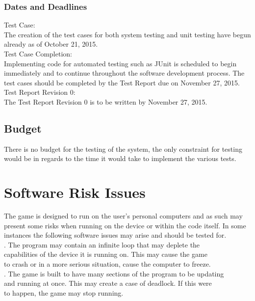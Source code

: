 \documentclass[12pt, letterpaper]{article}
\begin{document}
	\subsubsection{Dates and Deadlines}
	Test Case:\\
	\noindent The creation of the test cases for both system testing and unit testing have begun already as of October 21, 2015.\\
	
	\noindent Test Case Completion:\\
	\noindent Implementing code for automated testing such as JUnit is scheduled to begin immediately and to continue throughout the software development process. The test cases should be completed by the Test Report due on November 27, 2015.\\
	
	\noindent Test Report Revision 0:\\
	\noindent The Test Report Revision 0 is to be written by November 27, 2015.
	
	\subsection{Budget}
	\indent \indent There is no budget for the testing of the system, the only constraint for testing would be in regards to the time it would take to implement the various tests.
	
	\section{Software Risk Issues}
	\indent \indent The game is designed to run on the user's personal computers and as such may present some risks when running on the device or within the code itself. In some instances the following software issues may arise and should be tested for.\\
	
	. \indent The program may contain an infinite loop that may deplete the\\
	\indent \indent capabilities of the device it is running on. This may cause the game\\
	\indent \indent to crash or in a more serious situation, cause the computer to freeze.\\
	
	. \indent The game is built to have many sections of the program to be updating\\
	\indent \indent and running at once. This may create a case of deadlock. If this were\\
	\indent \indent to happen, the game may stop running.\\
	
\end{document}
